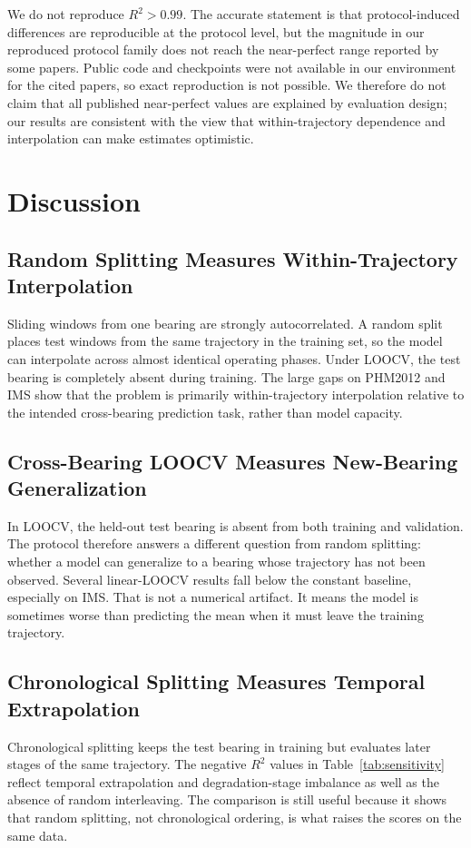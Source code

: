 \documentclass[pdflatex,sn-mathphys-num]{sn-jnl}
\begin{document}
We do not reproduce $R^2>0.99$. The accurate statement is that protocol-induced differences are reproducible at the protocol level, but the magnitude in our reproduced protocol family does not reach the near-perfect range reported by some papers. Public code and checkpoints were not available in our environment for the cited papers, so exact reproduction is not possible. We therefore do not claim that all published near-perfect values are explained by evaluation design; our results are consistent with the view that within-trajectory dependence and interpolation can make estimates optimistic.

\section{Discussion}
\subsection{Random Splitting Measures Within-Trajectory Interpolation}
Sliding windows from one bearing are strongly autocorrelated. A random split places test windows from the same trajectory in the training set, so the model can interpolate across almost identical operating phases. Under LOOCV, the test bearing is completely absent during training. The large gaps on PHM2012 and IMS show that the problem is primarily within-trajectory interpolation relative to the intended cross-bearing prediction task, rather than model capacity.

\subsection{Cross-Bearing LOOCV Measures New-Bearing Generalization}
In LOOCV, the held-out test bearing is absent from both training and validation. The protocol therefore answers a different question from random splitting: whether a model can generalize to a bearing whose trajectory has not been observed. Several linear-LOOCV results fall below the constant baseline, especially on IMS. That is not a numerical artifact. It means the model is sometimes worse than predicting the mean when it must leave the training trajectory.

\subsection{Chronological Splitting Measures Temporal Extrapolation}
Chronological splitting keeps the test bearing in training but evaluates later stages of the same trajectory. The negative $R^2$ values in Table~\ref{tab:sensitivity} reflect temporal extrapolation and degradation-stage imbalance as well as the absence of random interleaving. The comparison is still useful because it shows that random splitting, not chronological ordering, is what raises the scores on the same data.
\end{document}
